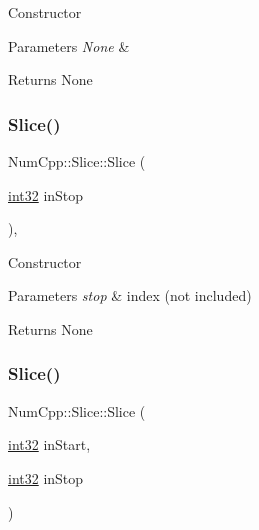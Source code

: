 Constructor


\begin{DoxyParams}{Parameters}
{\em None} & \\
\hline
\end{DoxyParams}
\begin{DoxyReturn}{Returns}
None 
\end{DoxyReturn}
\mbox{\label{class_num_cpp_1_1_slice_a396190f16de290b03b8ba4b46cad0cfd}} 
\subsubsection{\texorpdfstring{Slice()}{Slice()}\hspace{0.1cm}{\footnotesize\ttfamily [2/4]}}
{\footnotesize\ttfamily Num\+Cpp\+::\+Slice\+::\+Slice (\begin{DoxyParamCaption}\item[{\mbox{\hyperlink{namespace_num_cpp_acf3eb1592f8b248ff0a236634864633c}{int32}}}]{in\+Stop }\end{DoxyParamCaption})\hspace{0.3cm}{\ttfamily [inline]}, {\ttfamily [explicit]}}

Constructor


\begin{DoxyParams}{Parameters}
{\em stop} & index (not included)\\
\hline
\end{DoxyParams}
\begin{DoxyReturn}{Returns}
None 
\end{DoxyReturn}
\mbox{\label{class_num_cpp_1_1_slice_af6f987a9f02fd455e41b2b1b8616782a}} 
\subsubsection{\texorpdfstring{Slice()}{Slice()}\hspace{0.1cm}{\footnotesize\ttfamily [3/4]}}
{\footnotesize\ttfamily Num\+Cpp\+::\+Slice\+::\+Slice (\begin{DoxyParamCaption}\item[{\mbox{\hyperlink{namespace_num_cpp_acf3eb1592f8b248ff0a236634864633c}{int32}}}]{in\+Start,  }\item[{\mbox{\hyperlink{namespace_num_cpp_acf3eb1592f8b248ff0a236634864633c}{int32}}}]{in\+Stop }\end{DoxyParamCaption})\hspace{0.3cm}{\ttfamily [inline]}}

